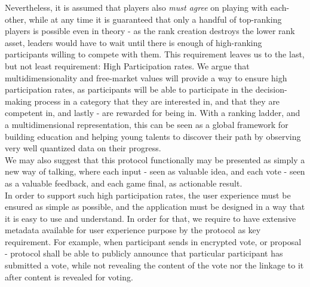 \documentclass{article}
\begin{document}
\begin{CJK}{UTF8}{gbsn}
\begin{multicols}{2}
        Nevertheless, it is assumed that players also \textit{must agree} on playing with each-other, while at any time it is guaranteed that only a handful of top-ranking players is possible even in theory - as the rank creation destroys the lower rank asset, leaders would have to wait until there is enough of high-ranking participants willing to compete with them.
        This requirement leaves us to the last, but not least requirement: High Participation rates.
        We argue that multidimensionality and free-market values will provide a way to ensure high participation rates, as participants will be able to participate in the decision-making process in a category that they are interested in, and that they are competent in, and lastly - are rewarded for being in.
        With a ranking ladder, and a multidimensional representation, this can be seen as a global framework for building education and helping young talents to discover their path by observing very well quantized data on their progress. \\ We may also suggest that this protocol functionally may be presented as simply a new way of talking, where each input - seen as valuable idea, and each vote - seen as a valuable feedback, and each game final, as actionable result.\\
        In order to support such high participation rates, the user experience must be ensured as simple as possible, and the application must be designed in a way that it is easy to use and understand. In order for that, we require to have extensive metadata available for user experience purpose by the protocol as key requirement. For example, when participant sends in encrypted vote, or proposal - protocol shall be able to publicly announce that particular participant has submitted a vote, while not revealing the content of the vote nor the linkage to it after content is revealed for voting.\\






\end{multicols}
\end{CJK}
\end{document}
